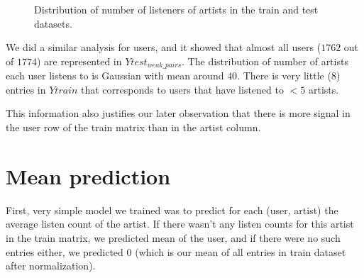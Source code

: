 \documentclass{report}
\begin{document}
\begin{figure}[!h]
\center
{}
\label{fig:artistListeners}
\hfill
\caption{Distribution of number of listeners of artists in the train and test datasets.}
\end{figure}

We did a similar analysis for users, and it showed that almost all users ($1762$ out of $1774$) are represented in $Ytest_{weak\_pairs}$. The distribution of number of artists each user listens to is Gaussian with mean around $40$. There is very little ($8$) entries in $Ytrain$ that corresponds to users that have listened to $< 5$ artists.

This information also justifies our later observation that there is more signal in the user row of the train matrix than in the artist column.

\section{Mean prediction} \label{meanPred}
First, very simple model we trained was to predict for each (user, artist) the average listen count of the artist. If there wasn't any listen counts for this artist in the train matrix, we predicted mean of the user, and if there were no such entries either, we predicted $0$ (which is our mean of all entries in train dataset after normalization).
\end{document}
